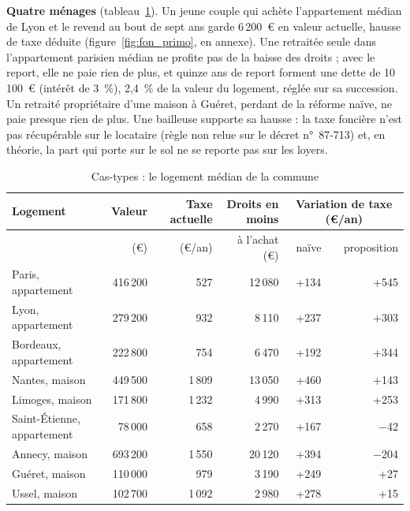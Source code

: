 \documentclass[11pt,a4paper]{article}
\begin{document}
\textbf{Quatre ménages} (tableau~\ref{tab:fon_cas}). Un jeune couple qui achète l'appartement médian de Lyon et le revend
au bout de sept ans garde 6\,200~€ en valeur actuelle, hausse de taxe déduite (figure~\ref{fig:fon_primo}, en annexe).
Une retraitée seule dans l'appartement parisien médian ne profite pas de la baisse des droits ; avec le report, elle ne
paie rien de plus, et quinze ans de report forment une dette de 10\,100~€ (intérêt de 3~\%), 2,4~\% de la valeur du
logement, réglée sur sa succession. Un retraité propriétaire d'une maison à Guéret, perdant de la réforme naïve, ne paie
presque rien de plus. Une bailleuse supporte sa hausse : la taxe foncière n'est pas récupérable sur le locataire
(règle non relue sur le décret n°~87-713) et, en théorie, la part qui porte sur le sol ne se reporte pas sur les loyers.

\begin{table}[!htbp]\centering\scriptsize
\caption{Cas-types : le logement médian de la commune}\label{tab:fon_cas}
\begin{tabularx}{\linewidth}{@{}>{\raggedright\arraybackslash}X rrrrr@{}}
\toprule
Logement & Valeur & Taxe actuelle & Droits en moins & \multicolumn{2}{c}{Variation de taxe (€/an)} \\
\cmidrule(l){5-6}
 & (€) & (€/an) & à l'achat (€) & naïve & proposition \\
\midrule
Paris, appartement & 416\,200 & 527 & 12\,080 & +134 & +545 \\
Lyon, appartement & 279\,200 & 932 & 8\,110 & +237 & +303 \\
Bordeaux, appartement & 222\,800 & 754 & 6\,470 & +192 & +344 \\
Nantes, maison & 449\,500 & 1\,809 & 13\,050 & +460 & +143 \\
Limoges, maison & 171\,800 & 1\,232 & 4\,990 & +313 & +253 \\
Saint-Étienne, appartement & 78\,000 & 658 & 2\,270 & +167 & $-$42 \\
Annecy, maison & 693\,200 & 1\,550 & 20\,120 & +394 & $-$204 \\
Guéret, maison & 110\,000 & 979 & 3\,190 & +249 & +27 \\
Ussel, maison & 102\,700 & 1\,092 & 2\,980 & +278 & +15 \\
\bottomrule
\end{tabularx}
\par\vspace{2pt}{\raggedright\scriptsize Valeur : prix médian au m² des ventes 2023-2024 × surface médiane ; taxe
de 2025 ; droits au taux permanent ; sans effet sur les prix ni reprise des ventes.\par}
\end{table}
\end{document}
